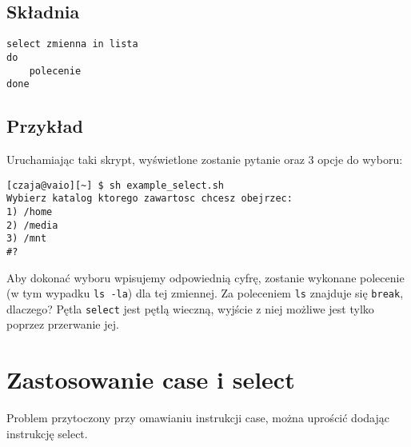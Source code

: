 \documentclass[10 pt, a4paper]{article}
\begin{document}
\subsection{Składnia}

\begin{lstlisting}
select zmienna in lista
do
	polecenie
done
\end{lstlisting}

\subsection{Przykład}


Uruchamiając taki skrypt, wyświetlone zostanie pytanie oraz 3 opcje do wyboru: \newline
\begin{verbatim}
[czaja@vaio][~] $ sh example_select.sh
Wybierz katalog ktorego zawartosc chcesz obejrzec:
1) /home
2) /media
3) /mnt
#?
\end{verbatim}
Aby dokonać wyboru wpisujemy odpowiednią cyfrę, zostanie wykonane polecenie (w tym
wypadku \texttt{ls -la}) dla tej zmiennej. Za poleceniem \texttt{ls} znajduje się \texttt{break}, dlaczego? Pętla \texttt{select} jest pętlą wieczną, wyjście z niej możliwe jest tylko poprzez przerwanie jej.
 
\section{Zastosowanie case i select}
Problem przytoczony przy omawianiu instrukcji case, można uprościć dodając instrukcję select. \newline

\end{document}
